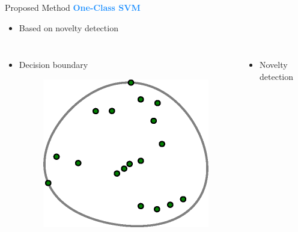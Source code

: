 \begin{frame}{Proposed Method}
    \Large\textcolor{dodgerblue}{\textbf{One-Class SVM}}
    \normalsize
    \vspace{5pt}
    \begin{itemize}
        \item Based on novelty detection
    \end{itemize}
    \vspace{-9pt}
    \begin{columns}
    \begin{itemize}
        \item Decision boundary
        \vspace{2pt}
        \begin{figure}
            \centering
            \includegraphics[scale=.5]{figures/svm_boundary.eps}
        \end{figure}
    \end{itemize}
    \begin{itemize}
        \item Novelty detection
        \vspace{2pt}
        \begin{figure}
            \centering

\end{figure}
\end{itemize}
\end{columns}
\end{frame}
